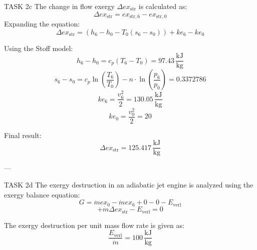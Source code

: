 TASK 2c  
The change in flow exergy \( \Delta ex_{\text{str}} \) is calculated as:  
\[
\Delta ex_{\text{str}} = ex_{\text{str},6} - ex_{\text{str},0}
\]  
Expanding the equation:  
\[
\Delta ex_{\text{str}} = (h_6 - h_0 - T_0 (s_6 - s_0)) + ke_6 - ke_0
\]  

Using the Stoff model:  
\[
h_6 - h_0 = c_p (T_6 - T_0) = 97.43 \, \frac{\text{kJ}}{\text{kg}}
\]  
\[
s_6 - s_0 = c_p \ln\left(\frac{T_6}{T_0}\right) - n \cdot \ln\left(\frac{p_6}{p_0}\right) = 0.3372786
\]  
\[
ke_6 = \frac{v_6^2}{2} = 130.05 \, \frac{\text{kJ}}{\text{kg}}
\]  
\[
ke_0 = \frac{v_0^2}{2} = 20
\]  

Final result:  
\[
\Delta ex_{\text{str}} = 125.417 \, \frac{\text{kJ}}{\text{kg}}
\]  

---

TASK 2d  
The exergy destruction in an adiabatic jet engine is analyzed using the exergy balance equation:  
\[
G = \dot{m} ex_0 - \dot{m} ex_6 + 0 - 0 - E_{\text{verl}}
\]  
\[
+ \dot{m} \Delta ex_{\text{str}} - E_{\text{verl}} = 0
\]  

The exergy destruction per unit mass flow rate is given as:  
\[
\frac{E_{\text{verl}}}{\dot{m}} = 100 \, \frac{\text{kJ}}{\text{kg}}
\]